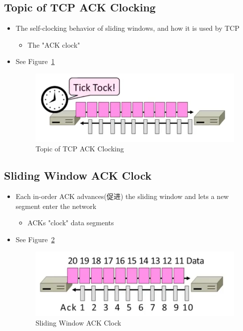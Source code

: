 \documentclass[12pt]{ctexart}   %
\begin{document}
	\subsection{Topic of TCP ACK Clocking}
	\begin{itemize}
		\item The self-clocking behavior of sliding windows, and how it is used by TCP
		\begin{itemize}
			\item The "ACK clock"
		\end{itemize}
		\item See Figure~\ref{fig:7-5-1}
		  
		 \begin{figure}[h!] %
		\centering
		 \includegraphics[scale=0.7]{images/7-5-1}
		\caption{ Topic of TCP ACK Clocking}
		 \label{fig:7-5-1}
		 \end{figure}
	\end{itemize}
	
	\subsection{Sliding Window ACK Clock}
	\begin{itemize}
		\item Each in-order ACK advances(促进) the sliding window and  lets a new segment enter the network
		\begin{itemize}
			\item ACKs "clock" data segments
		\end{itemize}
		\item See Figure~\ref{fig:7-5-2}
		  
		 \begin{figure}[h!] %
		\centering
		 \includegraphics[scale=0.7]{images/7-5-2}
		\caption{ Sliding Window ACK Clock}
		 \label{fig:7-5-2}
		 \end{figure}
	\end{itemize}
	
\end{document}
